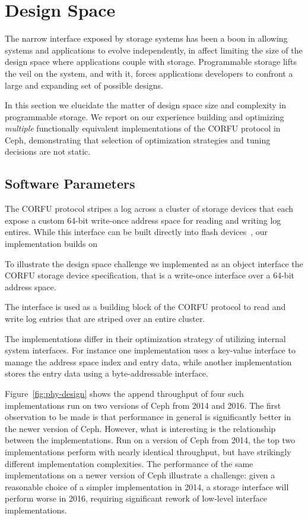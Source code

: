 \section{Design Space}
\label{sec:dspace}

The narrow interface exposed by storage systems has been a boon in allowing
systems and applications to evolve independently, in affect limiting the size
of the design space where applications couple with storage. Programmable
storage lifts the veil on the system, and with it, forces applications developers
to confront a large and expanding set of possible designs.

In this section we elucidate the matter of design space size and complexity in
programmable storage. We report on our experience building and optimizing
\emph{multiple} functionally equivalent implementations of the CORFU protocol
in Ceph, demonstrating that selection of optimization strategies and tuning
decisions are not static.

\subsection{Software Parameters}

The CORFU protocol stripes a log across a cluster of storage devices that each
expose a custom 64-bit write-once address space for reading and writing log
entires. While this interface can be built directly into flash
devices~\cite{wei:systor13}, our implementation builds on 

To illustrate the design space challenge we implemented as an object interface
the CORFU storage device specification, that is a write-once interface over a
64-bit address space.

The interface is used as a building block of the CORFU
protocol to read and write log entries that are striped over an entire
cluster.

 The implementations differ in their optimization strategy of
utilizing internal system interfaces. For instance one implementation uses a
key-value interface to manage the address space index and entry data, while
another implementation stores the entry data using a byte-addressable
interface. 

Figure~\ref{fig:phy-design} shows the append throughput of four such
implementations run on two versions of Ceph from 2014 and 2016. The first
observation to be made is that performance in general is significantly better
in the newer version of Ceph. However, what is interesting is the relationship
between the implementations. Run on a version of Ceph from 2014, the top two
implementations perform with nearly identical throughput, but have strikingly
different implementation complexities. The performance of the same
implementations on a newer version of Ceph illustrate a challenge: given a
reasonable choice of a simpler implementation in 2014, a storage interface
will perform worse in 2016, requiring significant rework of low-level
interface implementations.

